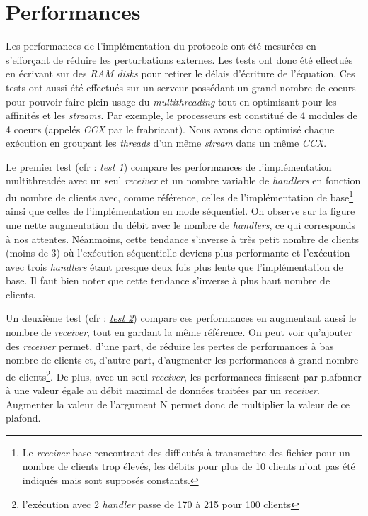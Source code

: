 \documentclass[../main.tex]{subfiles}
\begin{document}
\section{Performances}
\label{sec:performances}

Les performances de l'implémentation du protocole ont été mesurées en s'efforçant de réduire les perturbations externes. Les tests ont donc été 
effectués en écrivant sur des \textit{RAM disks} pour retirer le délais d'écriture de l'équation. Ces tests ont aussi été effectués sur un serveur 
possédant un grand nombre de coeurs pour pouvoir faire plein usage du \textit{multithreading} tout en optimisant pour les affinités et les \textit{streams}.
Par exemple, le processeurs est constitué de 4 modules de 4 coeurs (appelés \textit{CCX} par le frabricant). Nous avons donc optimisé chaque exécution
en groupant les \textit{threads} d'un même \textit{stream} dans un même \textit{CCX}.

Le premier test (cfr : \hyperref[sec:plot_1_recv]{\textit{test 1}}) compare les performances de l'implémentation multithreadée avec un seul \textit{receiver} et un nombre variable de \textit{handlers} 
en fonction du nombre de clients avec, comme référence, celles de l'implémentation de base\footnote{Le \textit{receiver} base rencontrant des 
difficutés à transmettre des fichier pour un nombre de clients trop élevés, les débits pour plus de 10 clients n'ont pas été indiqués mais sont 
supposés constants.} ainsi que celles de l'implémentation en mode séquentiel.          %
On observe sur la figure une nette augmentation du débit avec le nombre de \textit{handlers}, ce qui corresponds à nos attentes. Néanmoins, cette 
tendance s'inverse à très petit nombre de clients (moins de 3) où l'exécution séquentielle deviens plus performante et l'exécution avec trois \textit{handlers} étant 
presque deux fois plus lente que l'implémentation de base. Il faut bien noter que cette tendance s'inverse à plus haut nombre de clients.

Un deuxième test (cfr : \hyperref[sec:plot_mul_recv]{\textit{test 2}}) compare ces performances en augmentant aussi le nombre de \textit{receiver}, tout en gardant la même référence. On peut voir qu'ajouter 
des \textit{receiver} permet, d'une part, de réduire les pertes de performances à bas nombre de clients et, d'autre part, d'augmenter les performances à 
grand nombre de clients\footnote{l'exécution avec 2 \textit{handler} passe de 170  à 215 pour 100 clients}. De plus, avec un seul 
\textit{receiver}, les performances finissent par plafonner à une valeur égale au débit maximal de données traitées par un \textit{receiver}. Augmenter 
la valeur de l'argument N permet donc de multiplier la valeur de ce plafond.
\end{document}
